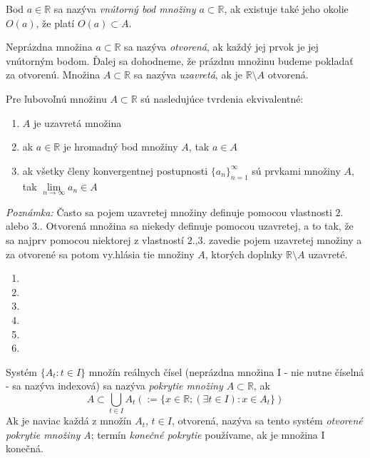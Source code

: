 Bod $a \in \mathbb{R}$ sa nazýva \textit{vnútorný bod množiny $a \subset
\mathbb{R}$}, ak existuje také jeho okolie $O(a)$, že platí $O(a) \subset A$.

Neprázdna množina $a \subset \mathbb{R}$ sa nazýva \textit{otvorená}, ak každý
jej prvok je jej vnútorným bodom. Ďalej sa dohodneme, že prázdnu množinu budeme
pokladať za otvorenú. Množina $A \subset \mathbb{R}$ sa nazýva
\textit{uzavretá}, ak je $\mathbb{R} \setminus A$ otvorená.

\begin{veta}
Pre ľubovoľnú množinu $A \subset \mathbb{R}$ sú nasledujúce tvrdenia
ekvivalentné:
\begin{enumerate}
\item
    $A$ je uzavretá množina
\item
    ak $a \in \mathbb{R}$ je hromadný bod množiny $A$, tak $a \in A$
\item
    ak všetky členy konvergentnej postupnosti ${\{a_n\}}_{n=1}^\infty$ sú
    prvkami množiny $A$, tak $\lim\limits_{n \rightarrow \infty} a_n \in A$
\end{enumerate}
\end{veta}

\textit{Poznámka:}
Často sa pojem uzavretej množiny definuje pomocou vlastnosti $2.$ alebo $3.$.
Otvorená množina sa niekedy definuje pomocou uzavretej, a to tak, že sa najprv
pomocou niektorej z vlastností $2.$,$3.$ zavedie pojem uzavretej množiny a za
otvorené sa potom vy.hlásia tie množiny $A$, ktorých doplnky $\mathbb{R}
\setminus A$ uzavreté.
\begin{enumerate}[resume]
    \item {}
    \item {}
    \item {}
    \item {}
    \item {}
    \item {}
\end{enumerate}

Systém $\{A_t: t \in I\}$ množín reálnych čísel (neprázdna množina I - nie nutne
číselná - sa nazýva indexová) sa nazýva \textit{pokrytie množiny $A \subset
\mathbb{R}$}, ak
\[
    A \subset \bigcup_{t \in I} A_t (:= \{x \in \mathbb{R};
    (\exists t \in I): x \in A_t\})
\]
Ak je naviac každá z množín $A_t$, $t \in I$,
otvorená, nazýva sa tento systém \textit{otvorené pokrytie množiny A}; termín
\textit{konečné pokrytie} používame, ak je množina I konečná.

